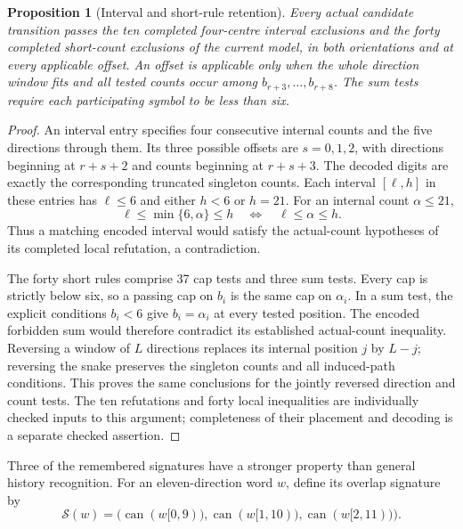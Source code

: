 \documentclass[11pt,a4paper]{article}
\newtheorem{proposition}[theorem]{Proposition}
\theoremstyle{definition}
\theoremstyle{remark}
\begin{document}
\begin{proposition}[Interval and short-rule retention]\label{prop:local-filter-retention}
Every actual candidate transition passes the ten completed four-centre
interval exclusions and the forty completed short-count exclusions of the
current model, in both orientations and at every applicable offset.
An offset is applicable only when the whole direction window fits and all
tested counts occur among $b_{r+3},\ldots,b_{r+8}$. The sum tests require
each participating symbol to be less than six.
\end{proposition}
\begin{proof}
An interval entry specifies four consecutive internal counts and the five
directions through them. Its three possible offsets are $s=0,1,2$, with
directions beginning at $r+s+2$ and counts beginning at $r+s+3$. The decoded
digits are exactly the corresponding truncated singleton counts. Each
interval $[\ell,h]$ in these entries has $\ell\le6$ and either $h<6$ or
$h=21$. For an internal count $\alpha\le21$,
\[
\ell\le\min\{6,\alpha\}\le h
\quad\Longleftrightarrow\quad
\ell\le\alpha\le h.
\]
Thus a matching encoded interval would satisfy the actual-count hypotheses
of its completed local refutation, a contradiction.

The forty short rules comprise 37 cap tests and three sum tests. Every cap
is strictly below six, so a passing cap on $b_i$ is the same cap on
$\alpha_i$. In a sum test, the explicit conditions $b_i<6$ give
$b_i=\alpha_i$ at every tested position. The encoded forbidden sum would
therefore contradict its established actual-count inequality. Reversing a
window of $L$ directions replaces its internal position $j$ by $L-j$;
reversing the snake preserves the singleton counts and all induced-path
conditions. This proves the same conclusions for the jointly reversed
direction and count tests. The ten refutations and forty local inequalities
are individually checked inputs to this argument; completeness of their
placement and decoding is a separate checked assertion.
\end{proof}

Three of the remembered signatures have a stronger property than general
history recognition. For an eleven-direction word $w$, define its overlap
signature by
\[
\mathcal S(w)=\bigl(\operatorname{can}(w[0,9)),
\operatorname{can}(w[1,10)),\operatorname{can}(w[2,11))\bigr).
\]
\end{document}
